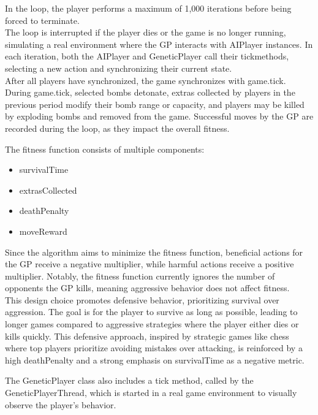 \documentclass[sigconf]{acmart} %
\begin{document}
In the loop, the player performs a maximum of 1,000 iterations before being forced to terminate. \\ 
The loop is interrupted if the player dies or the game is no longer running, simulating a real environment where the GP interacts with AIPlayer instances. In each iteration, both the AIPlayer and GeneticPlayer call their tickmethods, selecting a new action and synchronizing their current state. \\ 
After all players have synchronized, the game synchronizes with game.tick. During game.tick, selected bombs detonate, extras collected by players in the previous period modify their bomb range or capacity, and players may be killed by exploding bombs and removed from the game. Successful moves by the GP are recorded during the loop, as they impact the overall fitness.

The fitness function consists of multiple components: 
\begin{itemize}
      \item survivalTime 
      \item extrasCollected 
      \item deathPenalty 
      \item moveReward 
\end{itemize}

Since the algorithm aims to minimize the fitness function, beneficial actions for the GP receive a negative multiplier, while harmful actions receive a positive multiplier. Notably, the fitness function currently ignores the number of opponents the GP kills, meaning aggressive behavior does not affect fitness. \\
This design choice promotes defensive behavior, prioritizing survival over aggression. The goal is for the player to survive as long as possible, leading to longer games compared to aggressive strategies where the player either dies or kills quickly. This defensive approach, inspired by strategic games like chess where top players prioritize avoiding mistakes over attacking, is reinforced by a high deathPenalty and a strong emphasis on survivalTime as a negative metric.

The GeneticPlayer class also includes a tick method, called by the GeneticPlayerThread, which is started in a real game environment to visually observe the player's behavior. 
\end{document}
